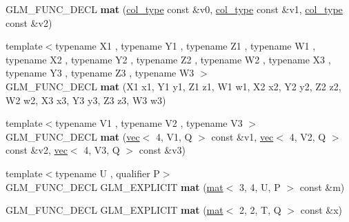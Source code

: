 \begin{DoxyCompactItemize}
\item 
\mbox{\label{structglm_1_1mat_3_013_00_014_00_01T_00_01Q_01_4_af2ebe7838d8fd3e462ef746ff884288f}} 
G\+L\+M\+\_\+\+F\+U\+N\+C\+\_\+\+D\+E\+CL {\bfseries mat} (\hyperlink{structglm_1_1vec_3_014_00_01T_00_01Q_01_4}{col\+\_\+type} const \&v0, \hyperlink{structglm_1_1vec_3_014_00_01T_00_01Q_01_4}{col\+\_\+type} const \&v1, \hyperlink{structglm_1_1vec_3_014_00_01T_00_01Q_01_4}{col\+\_\+type} const \&v2)
\item 
\mbox{\label{structglm_1_1mat_3_013_00_014_00_01T_00_01Q_01_4_afb748abafdd98219adecc31fb5f46562}} 
{\footnotesize template$<$typename X1 , typename Y1 , typename Z1 , typename W1 , typename X2 , typename Y2 , typename Z2 , typename W2 , typename X3 , typename Y3 , typename Z3 , typename W3 $>$ }\\G\+L\+M\+\_\+\+F\+U\+N\+C\+\_\+\+D\+E\+CL {\bfseries mat} (X1 x1, Y1 y1, Z1 z1, W1 w1, X2 x2, Y2 y2, Z2 z2, W2 w2, X3 x3, Y3 y3, Z3 z3, W3 w3)
\item 
\mbox{\label{structglm_1_1mat_3_013_00_014_00_01T_00_01Q_01_4_a6bce2b636fe333021919451231613643}} 
{\footnotesize template$<$typename V1 , typename V2 , typename V3 $>$ }\\G\+L\+M\+\_\+\+F\+U\+N\+C\+\_\+\+D\+E\+CL {\bfseries mat} (\hyperlink{structglm_1_1vec}{vec}$<$ 4, V1, Q $>$ const \&v1, \hyperlink{structglm_1_1vec}{vec}$<$ 4, V2, Q $>$ const \&v2, \hyperlink{structglm_1_1vec}{vec}$<$ 4, V3, Q $>$ const \&v3)
\item 
\mbox{\label{structglm_1_1mat_3_013_00_014_00_01T_00_01Q_01_4_a99a380b5828a4a092374fa3a28ebca45}} 
{\footnotesize template$<$typename U , qualifier P$>$ }\\G\+L\+M\+\_\+\+F\+U\+N\+C\+\_\+\+D\+E\+CL G\+L\+M\+\_\+\+E\+X\+P\+L\+I\+C\+IT {\bfseries mat} (\hyperlink{structglm_1_1mat}{mat}$<$ 3, 4, U, P $>$ const \&m)
\item 
\mbox{\label{structglm_1_1mat_3_013_00_014_00_01T_00_01Q_01_4_a07bd7f90855dd26a0a46629b15f2d0a1}} 
G\+L\+M\+\_\+\+F\+U\+N\+C\+\_\+\+D\+E\+CL G\+L\+M\+\_\+\+E\+X\+P\+L\+I\+C\+IT {\bfseries mat} (\hyperlink{structglm_1_1mat}{mat}$<$ 2, 2, T, Q $>$ const \&x)

\end{DoxyCompactItemize}
